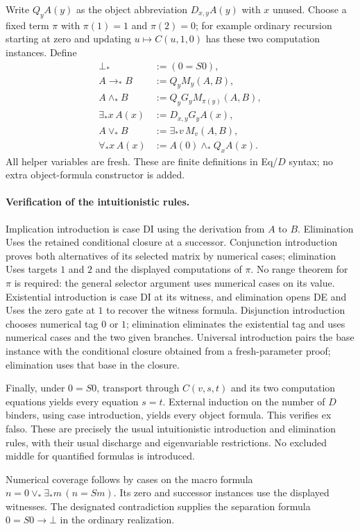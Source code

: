 \documentclass[11pt,letterpaper]{article}
\theoremstyle{definition}
\begin{document}
Write $Q_yA(y)$ as the object abbreviation $D_{x,y}A(y)$ with $x$
unused. Choose a fixed term $\pi$ with $\pi(1)=1$ and $\pi(2)=0$;
for example ordinary recursion starting at zero and updating
$u\mapsto C(u,1,0)$ has these two computation instances. Define
\begin{align*}
 \bot_*&:=(0=S0),\\
 A\to_* B&:=Q_yM_y(A,B),\\
 A\wedge_*B&:=Q_yG_yM_{\pi(y)}(A,B),\\
 \exists_*x\,A(x)&:=D_{x,y}G_yA(x),\\
 A\vee_*B&:=\exists_*v\,M_v(A,B),\\
 \forall_*x\,A(x)&:=A(0)\wedge_*Q_xA(x).
\end{align*}
All helper variables are fresh. These are finite definitions in Eq/$D$
syntax; no extra object-formula constructor is added.

\paragraph{Verification of the intuitionistic rules.}
Implication introduction is case DI using the derivation from $A$ to
$B$. Elimination Uses the retained conditional closure at a successor.
Conjunction introduction proves both alternatives of its selected
matrix by numerical cases; elimination Uses targets $1$ and $2$ and
the displayed computations of $\pi$. No range theorem for $\pi$ is
required: the general selector argument uses numerical cases on its value.
Existential introduction is case DI at its witness, and elimination
opens DE and Uses the zero gate at $1$ to recover the witness formula.
Disjunction introduction chooses numerical tag $0$ or $1$; elimination
eliminates the existential tag and uses numerical cases and the two
given branches. Universal introduction pairs the base instance with
the conditional closure obtained from a fresh-parameter proof;
elimination uses that base in the closure.

Finally, under $0=S0$, transport through $C(v,s,t)$ and its two
computation equations yields every equation $s=t$. External induction
on the number of $D$ binders, using case introduction, yields every
object formula. This verifies ex falso. These are precisely the usual
intuitionistic introduction and elimination rules, with their usual
discharge and eigenvariable restrictions. No excluded middle for
quantified formulas is introduced.

Numerical coverage follows by cases on the macro formula
$n=0\vee_*\exists_*m\,(n=Sm)$. Its zero and successor instances
use the displayed witnesses. The designated contradiction supplies
the separation formula $0=S0\to\bot$ in the ordinary realization.
\end{document}

